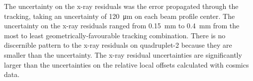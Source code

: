 The uncertainty on the x-ray residuals was the error propagated through the tracking, taking an uncertainty of \SI{120}{\micro\meter} on each beam profile center. The uncertainty on the x-ray residuals ranged from \SI{0.15}{mm} to \SI{0.4}{mm} from the most to least geometrically-favourable tracking combination. There is no discernible pattern to the x-ray residuals on quadruplet-2 because they are smaller than the uncertainty. The x-ray residual uncertainties are significantly larger than the uncertainties on the relative local offsets calculated with cosmics data.